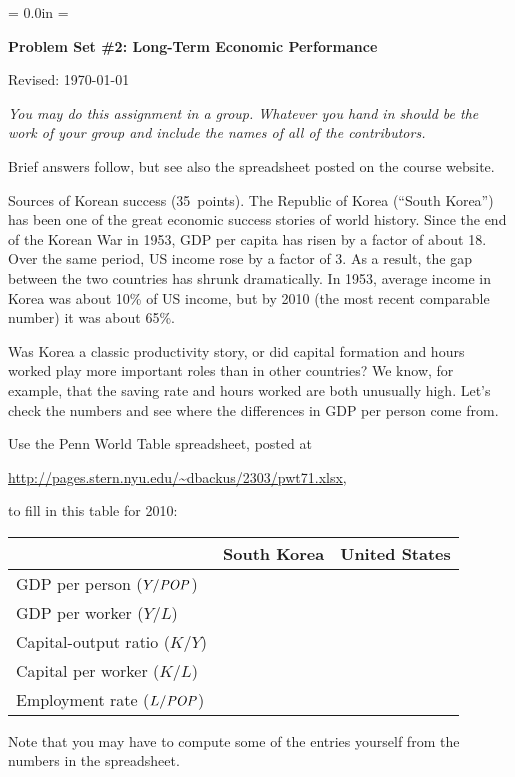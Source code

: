 \documentclass[12pt]{exam}
\def\HeadName{Problem Set \#2}
\newcommand{\POP}{\mbox{\it POP\/}}
\begin{document}
\parindent = 0.0in
\parskip = \bigskipamount
\thispagestyle{empty}%
\Head

\centerline{\large \bf \HeadName: Long-Term Economic Performance}
\centerline{Revised:  \today}


\medskip
{\it You may do this assignment in a group.
Whatever you hand in should be the work of your group
and include the names of all of the contributors.}

\begin{questions}

\begin{solution}
Brief answers follow,
but see also the spreadsheet posted on the course website.
\end{solution}

\question Sources of Korean success  (35~points).
The Republic of Korea (``South Korea'')
has been one of the great economic success stories of world history.
Since the end of the Korean War in 1953,
GDP per capita has risen by a factor of about 18.
Over the same period, US income rose by a factor of 3.
As a result, the gap between the two countries has shrunk dramatically.
In 1953, average income in Korea was about 10\% of US income,
but by 2010 (the most recent comparable number) it was about 65\%.


Was Korea a classic productivity story,
or did capital formation and hours worked play more important
roles than in other countries?
We know, for example, that the saving rate and hours worked
are both unusually high.
Let's check the numbers and see where the differences
in GDP per person come from.

Use the Penn World Table spreadsheet, posted at

\vspace*{\parskip}
\centerline{\url{http://pages.stern.nyu.edu/~dbackus/2303/pwt71.xlsx},}

to fill in this table for 2010:
%
\begin{center}
\begin{tabular}{lcc}
\toprule
        &  South Korea & United States \\
\midrule
GDP per person ($Y/\POP$) \phantom{xxxx}&  \\
GDP per worker ($Y/L$)    &  \\
Capital-output ratio ($K/Y$)  & \\
Capital per worker ($K/L$)    & \\
Employment rate ($L/\POP$)      & \\
\bottomrule
\end{tabular}
\end{center}
\smallskip
Note that you may have to compute some of the entries
yourself from the numbers in the spreadsheet.


\end{questions}
\end{document}
